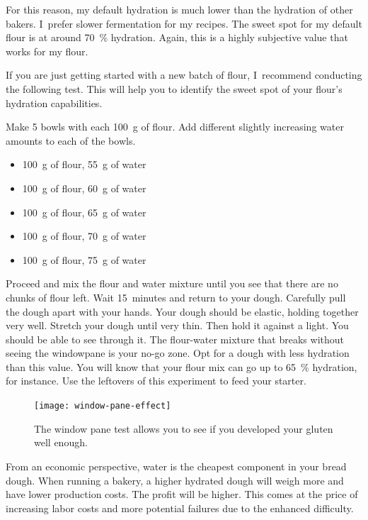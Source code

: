 For this reason, my default hydration is much lower than the hydration of other
bakers. I~prefer slower fermentation for my recipes.
The sweet spot for my default flour is at around \qty{70}{\percent} hydration.
Again, this is a highly subjective value that works for my flour.

If you are just getting started with a new batch of flour,
I~recommend conducting the following test. This will help you to
identify the sweet spot of your flour's hydration capabilities.

Make 5 bowls with each \qty{100}{\gram} of flour. Add different slightly increasing
water amounts to each of the bowls.

\begin{itemize}
  \item \qty{100}{\gram} of flour, \qty{55}{\gram} of water
  \item \qty{100}{\gram} of flour, \qty{60}{\gram} of water
  \item \qty{100}{\gram} of flour, \qty{65}{\gram} of water
  \item \qty{100}{\gram} of flour, \qty{70}{\gram} of water
  \item \qty{100}{\gram} of flour, \qty{75}{\gram} of water
\end{itemize}

Proceed and mix the flour and water mixture until you see that there
are no chunks of flour left. Wait 15~minutes and return to your dough.
Carefully pull the dough apart with your hands. Your dough should be elastic, holding
together very well. Stretch your dough until very thin. Then hold it against a light.
You should be able to see through it. The flour-water mixture that breaks without
seeing the windowpane is your no-go zone. Opt for a dough with
less hydration than this value. You will know that your flour mix can go up to
 \qty{65}{\percent} hydration, for instance. Use the leftovers of this experiment
to feed your starter.


\begin{figure}[!htb]
  \texttt{[image: window-pane-effect]}
  \caption[The window pane test]{The window pane test allows you to see if you
      developed your gluten well enough.}
\end{figure}


From an economic perspective, water is the cheapest component in your bread
dough. When running a bakery, a higher hydrated dough will weigh more and have
lower production costs. The profit will be higher. This comes at the price
of increasing labor costs and more potential failures due to the enhanced
difficulty.

